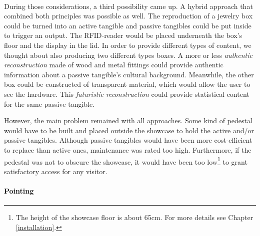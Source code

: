 \\
During those considerations, a third possibility came up. A hybrid approach that combined both principles was possible as well. The reproduction of a jewelry box could be turned into an active tangible and passive tangibles could be put inside to trigger an output. The \ac{RFID}-reader would be placed underneath the box's floor and the display in the lid. In order to provide different types of content, we thought about also producing two different types boxes. A more or less \textit{authentic reconstruction} made of wood and metal fittings could provide authentic information about a passive tangible's cultural background. Meanwhile, the other box could be constructed of transparent material, which would allow the user to see the hardware. This \textit{futuristic reconstruction} could provide statistical content for the same passive tangible.

However, the main problem remained with all approaches. Some kind of pedestal would have to be built and placed outside the showcase to hold the active and/or passive tangibles. Although passive tangibles would have been more cost-efficient to replace than active ones, maintenance was rated too high. Furthermore, if the pedestal was not to obscure the showcase, it would have been too low\footnote{The height of the showcase floor is about 65cm. For more details see Chapter \ref{installation}.} to grant satisfactory access for any visitor.


\paragraph{Pointing}


